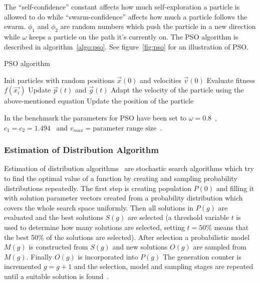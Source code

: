 The “self-confidence” constant affects how much self-exploration a particle is allowed to do while “swarm-confidence” affects how much a particle follows the swarm. $\phi_1$ and $\phi_2$ are random numbers which push the particle in a new direction while $\omega$ keeps a particle on the path it’s currently on. The PSO algorithm is described in algorithm~\ref{algo:pso}. See figure~\ref{fig:pso} for an illustration of PSO.

\begin{algorithm}[h]
  \caption{PSO algorithm}
  \label{algo:pso}
    \begin{algorithmic}
      \State Init particles with random positions
      $\vec{x}(0)$ and velocities $\vec{v}(0)$
      \Repeat
          \State Evaluate fitness $f(\vec{x_i})$
          \State Update $\vec{p}(t)$ and $\vec{g}(t)$
          \State Adapt the velocity of the particle using the above-mentioned equation
          \State Update the position of the particle
        \EndFor
    \end{algorithmic}
\end{algorithm}



In the benchmark the parameters for PSO have been set to $\omega = 0.8$~\cite{shi1998modified}, $c_1 = c_2 = 1.494$~\cite{kennedy1999small} and $v_{max} = \text{parameter range size}$~\cite{Das2008}.

\subsubsection{Estimation of Distribution Algorithm}

Estimation of distribution algorithms~\cite{Hauschild2011111} are stochastic search algorithms which try to find the optimal value of a function by creating and sampling probability distributions repeatedly. The first step is creating population $P(0)$ and filling it with solution parameter vectors created from a probability distribution which covers the whole search space uniformly. Then all solutions in $P(g)$ are evaluated and the best solutions $S(g)$ are selected (a threshold variable $t$ is used to determine how many solutions are selected, setting $t=50\%$ means that the best 50\% of the solutions are selected). After selection a probabilistic model $M(g)$ is constructed from $S(g)$ and new solutions $O(g)$ are sampled from $M(g)$. Finally $O(g)$ is incorporated into $P(g)$ The generation counter is incremented $g = g + 1$ and the selection, model and sampling stages are repeated until a suitable solution is found~\cite{Hauschild2011111}.

